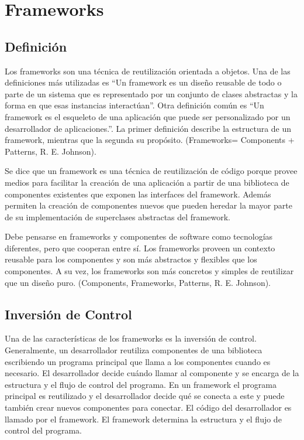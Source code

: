 
\section{Frameworks}


\subsection{Definición}


Los frameworks son una técnica de reutilización orientada a objetos.  Una de las
definiciones más utilizadas es ``Un framework es un diseño reusable de todo o
parte de un sistema que es representado por un conjunto de clases abstractas y
la forma en que esas instancias interactúan''. Otra definición común es ``Un
framework es el esqueleto de una aplicación que puede ser personalizado por un
desarrollador de aplicaciones.''. La primer definición describe la estructura de
un framework, mientras que la segunda su propósito. (Frameworks= Components +
Patterns, R. E. Johnson).

Se dice que un framework es una técnica de reutilización de código porque provee
medios para facilitar la creación de una aplicación a partir de una biblioteca
de componentes existentes que exponen las interfaces del framework. Además
permiten la creación de componentes nuevos que pueden heredar la mayor parte de
su implementación de superclases abstractas del framework.


Debe pensarse en frameworks y componentes de software como tecnologías
diferentes, pero que cooperan entre sí. Los frameworks proveen un contexto
reusable para los componentes y son más abstractos y flexibles que los
componentes. A su vez, los frameworks son  más concretos y simples de reutilizar
que un diseño puro. (Components, Frameworks, Patterns, R. E. Johnson).

\subsection{Inversión de Control}
\label{sec:inversion_control}
Una de las características de los frameworks es la inversión de control.
Generalmente, un desarrollador reutiliza componentes de una biblioteca 
escribiendo un programa principal que llama a los componentes cuando es 
necesario. El desarrollador decide cuándo llamar al componente y se encarga de
la estructura y el flujo de control del programa. En un framework el programa
principal es reutilizado y el desarrollador decide qué se conecta a este y
puede también crear nuevos componentes para conectar. El código del
desarrollador es llamado por el framework. El framework determina la estructura
y el flujo de control del programa.

